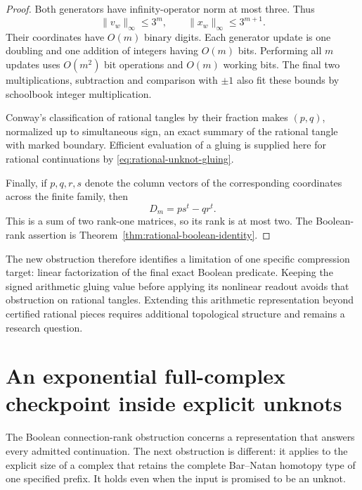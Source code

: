 \documentclass[11pt,a4paper]{article}
\theoremstyle{definition}
\theoremstyle{remark}
\numberwithin{equation}{section}
\begin{document}
\begin{proof}
Both generators have infinity-operator norm at most three.  Thus
\[
 \|v_w\|_\infty\le3^m,\qquad
 \|x_w\|_\infty\le3^{m+1}.
\]
Their coordinates have $O(m)$ binary digits.  Each generator update is one
doubling and one addition of integers having $O(m)$ bits.  Performing all
$m$ updates uses $O(m^2)$ bit operations and $O(m)$ working bits.
The final two multiplications, subtraction and comparison with $\pm1$
also fit these bounds by schoolbook integer multiplication.

Conway's classification of rational tangles by their fraction
\cite[Theorem~1]{kauffman-lambropoulou-tangles} makes $(p,q)$, normalized up
to simultaneous sign, an exact summary of the rational tangle with marked
boundary.  Efficient evaluation of a gluing is supplied here for rational
continuations by \eqref{eq:rational-unknot-gluing}.

Finally, if $p,q,r,s$ denote the column vectors of the corresponding
coordinates across the finite family, then
\[
 D_m=ps^t-qr^t.
\]
This is a sum of two rank-one matrices, so its rank is at most two.
The Boolean-rank assertion is Theorem~\ref{thm:rational-boolean-identity}.
\end{proof}

The new obstruction therefore identifies a limitation of one specific
compression target: linear factorization of the final exact Boolean
predicate.  Keeping the signed arithmetic gluing value before applying
its nonlinear readout avoids that obstruction on rational tangles.
Extending this arithmetic representation beyond certified rational pieces
requires additional topological structure and remains a research question.


\section{An exponential full-complex checkpoint inside explicit unknots}
\label{sec:unknot-checkpoint-lower-bound}

The Boolean connection-rank obstruction concerns a representation that
answers every admitted continuation.  The next obstruction is different:
it applies to the explicit size of a complex that retains the complete
Bar--Natan homotopy type of one specified prefix.  It holds even when the
input is promised to be an unknot.
\end{document}
